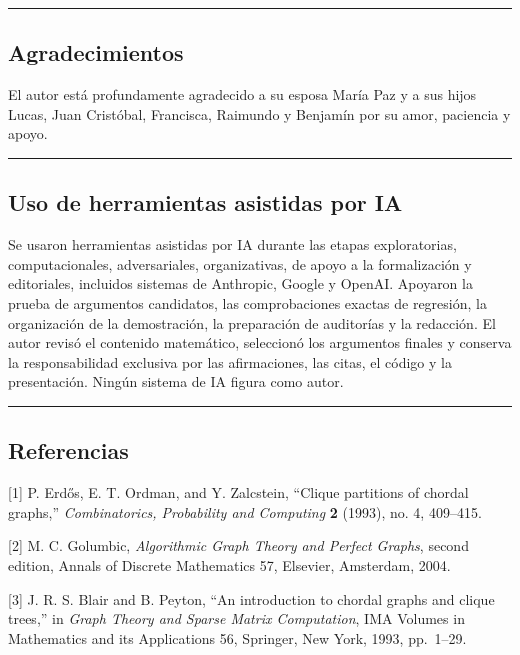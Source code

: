 \documentclass[
  spanish,
  11pt,
  a4paper,
]{article}
\begin{document}
\begin{center}\rule{0.5\linewidth}{0.5pt}\end{center}

\subsection{Agradecimientos}\label{agradecimientos}

El autor está profundamente agradecido a su esposa María Paz y a sus hijos Lucas, Juan Cristóbal, Francisca, Raimundo y Benjamín por su amor, paciencia y apoyo.

\begin{center}\rule{0.5\linewidth}{0.5pt}\end{center}

\subsection{Uso de herramientas asistidas por IA}\label{uso-de-herramientas-asistidas-por-ia}

Se usaron herramientas asistidas por IA durante las etapas exploratorias, computacionales, adversariales, organizativas, de apoyo a la formalización y editoriales, incluidos sistemas de Anthropic, Google y OpenAI. Apoyaron la prueba de argumentos candidatos, las comprobaciones exactas de regresión, la organización de la demostración, la preparación de auditorías y la redacción. El autor revisó el contenido matemático, seleccionó los argumentos finales y conserva la responsabilidad exclusiva por las afirmaciones, las citas, el código y la presentación. Ningún sistema de IA figura como autor.

\begin{center}\rule{0.5\linewidth}{0.5pt}\end{center}

\subsection{Referencias}\label{referencias}

{[}1{]} P. Erdős, E. T. Ordman, and Y. Zalcstein, ``Clique partitions of chordal graphs,'' \emph{Combinatorics, Probability and Computing} \textbf{2} (1993), no. 4, 409--415.

{[}2{]} M. C. Golumbic, \emph{Algorithmic Graph Theory and Perfect Graphs}, second edition, Annals of Discrete Mathematics 57, Elsevier, Amsterdam, 2004.

{[}3{]} J. R. S. Blair and B. Peyton, ``An introduction to chordal graphs and clique trees,'' in \emph{Graph Theory and Sparse Matrix Computation}, IMA Volumes in Mathematics and its Applications 56, Springer, New York, 1993, pp.~1--29.
\end{document}
